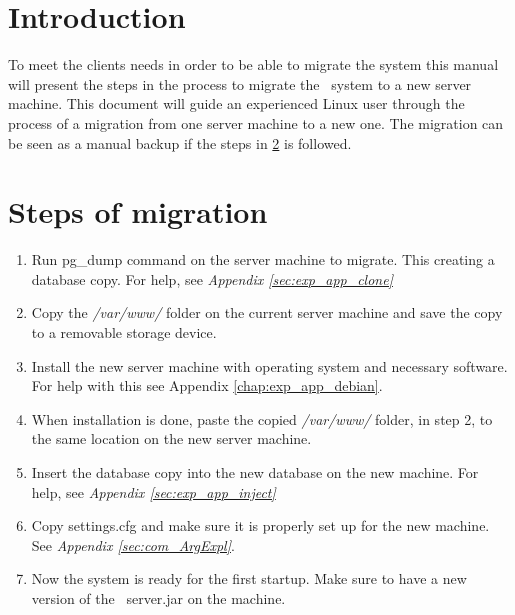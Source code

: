 \label{chap:exp_app_migration}
\section{Introduction}
To meet the clients needs in order to be able to migrate the system this manual will present the steps in the process to migrate the \appName\ system to a new server machine. This document will guide an experienced Linux user through the process of a migration from one server machine to a new one. The migration can be seen as a manual backup if the steps in \ref{sec:exp_steps} is followed. 

\section{Steps of migration}\label{sec:exp_steps}
\begin{enumerate}
	\item Run pg\_dump command on the server machine to migrate. This creating a database copy. For help, see \emph{Appendix \ref{sec:exp_app_clone}}
	\item Copy the \emph{/var/www/} folder on the current server machine and save the copy to a removable storage device.
	\item Install the new server machine with operating system and necessary software. For help with this see Appendix \ref{chap:exp_app_debian}.
	\item When installation is done, paste the copied \emph{/var/www/} folder, in step 2, to the same location on the new server machine. 
	\item Insert the database copy into the new database on the new machine. For help, see \emph{Appendix \ref{sec:exp_app_inject}}
	\item Copy settings.cfg and make sure it is properly set up for the new machine. See \emph{Appendix \ref{sec:com_ArgExpl}}.
	\item Now the system is ready for the first startup. Make sure to have a new version of the \appName\ server.jar on the machine.
\end{enumerate}



